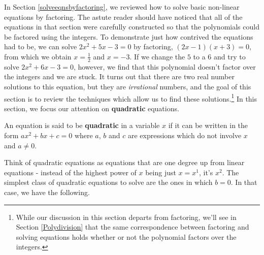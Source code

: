 \documentclass{ximera}
\begin{document}
	\author{Stitz-Zeager}




\setcounter{footnote}{0}

\label{AppQuadEqus}

In Section \ref{solveeqnsbyfactoring}, we reviewed how to solve basic non-linear equations by factoring.  The astute reader should have noticed that all of the equations in that section were carefully constructed so that the polynomials could be factored using the integers.  To demonstrate just how contrived the equations had to be, we can solve $2x^2+5x-3=0$ by factoring, $(2x-1)(x+3) = 0$, from which we obtain $x = \frac{1}{2}$ and $x = -3$.  If we change the $5$ to a $6$ and try to solve $2x^2 + 6x - 3 = 0$, however, we find that this polynomial doesn't factor over the integers and we are stuck.  It turns out that there are two real number solutions to this equation, but they are \textit{irrational} numbers, and the goal of this section is to review the techniques which allow us to find these solutions.\footnote{While our discussion in this section departs from factoring, we'll see in Section \ref{Polydivision} that the same correspondence between factoring and solving equations holds whether or not the polynomial factors over the integers.}  In this section, we focus our attention on \textbf{quadratic} equations.

 


\begin{definition}\label{quadeqndefn} An equation is said to be \textbf{quadratic} in a variable $x$ if it can be written in the form $ax^2 + bx + c = 0$ where $a$, $b$ and $c$ are expressions which do not involve $x$ and $a \neq 0$.

\end{definition}


 

Think of quadratic equations as equations that are one degree up from linear equations - instead of the highest power of $x$ being just $x = x^1$, it's $x^2$.  The simplest class of quadratic equations to solve are the ones in which $b = 0$.  In that case, we have the following.

 

\label{extractingthesquareroot}
\end{document}
